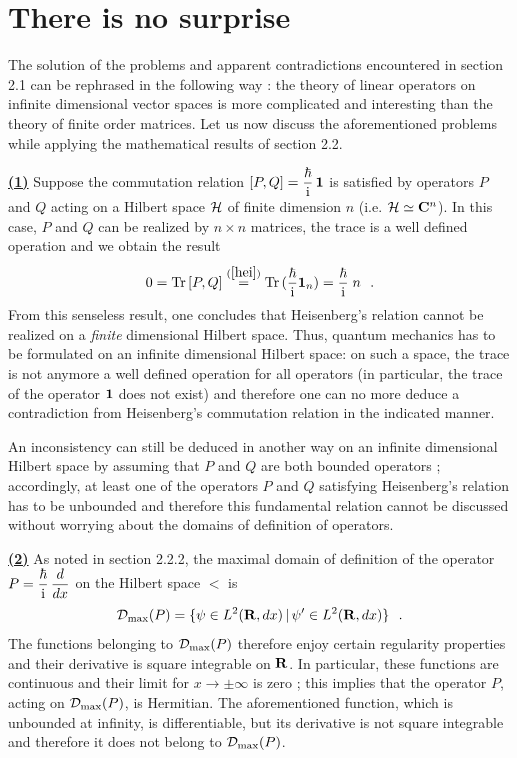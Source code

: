 \documentclass[a4wide,12pt]{report}
\begin{document}
 
\newpage
 
\appendix
 
 
\chapter{There is no surprise}
 
The solution of the problems and apparent contradictions 
encountered in section 2.1
can be rephrased in the following way \cite{rs}:
the theory of linear operators on infinite dimensional vector 
spaces is more complicated and interesting than the theory  
of finite order matrices. Let us now discuss   
the aforementioned problems while applying the mathematical results 
of section 2.2. 

 
\bigskip
 
\underline{{\bf (1)}}
Suppose  the commutation relation 
$[P,Q] = \displaystyle{\hbar \over {\rm i}} \, {\bf 1}$ is satisfied by operators 
$P$ and $Q$ acting on a Hilbert space ${\cal H}$ of finite dimension 
$n$ (i.e. ${\cal H} \simeq {\bf C}^n$). 
In this case, $P$ and $Q$ 
can be realized by $n\times n$ matrices, the trace is a 
well defined operation and we obtain the result 
\[
0 = {\rm Tr} \, [P,Q ] 
\stackrel{(\ref{hei})}{=} {\rm Tr} \, ( \displaystyle{\hbar \over {\rm i}}
{\bf 1}_n ) =
\displaystyle{\hbar \over {\rm i}}\; n
\ \ .
\]
From this senseless result,
one concludes that Heisenberg's relation
cannot be realized on a {\em finite} dimensional Hilbert space. 
Thus, quantum mechanics has to be formulated on an
infinite dimensional Hilbert space: on such a space,  
the trace is not anymore a well defined operation for all operators 
(in particular, the trace of the operator ${\bf 1}$ does not 
exist) and therefore one can no more  deduce a contradiction from 
Heisenberg's commutation relation in the indicated manner. 

An inconsistency can still be deduced in another way 
on an infinite dimensional Hilbert space 
by assuming that 
$P$ and $Q$ are both bounded operators \cite{rs};
accordingly, 
at least one of the operators $P$ and $Q$ satisfying Heisenberg's
relation has to be unbounded and therefore this fundamental relation cannot
be discussed without worrying about the domains of definition of operators. 
 
\bigskip
 
\underline{{\bf (2)}}
As noted in section 2.2.2, 
the maximal domain of definition of the operator 
$P= \displaystyle{\hbar \over {\rm i}} \, \displaystyle{d \over dx}$ 
on the Hilbert space $\lt$
is
\[
{\cal D}_{\rm max} (P) = \{ \psi \in {L^2 ({{\bf R}},dx)} \, | \,
\psi^{\prime} \in {L^2 ({{\bf R}},dx)} \}
\ \ .
\]
The functions belonging to ${\cal D}_{\rm max} (P)$ therefore enjoy  
certain regularity properties and their derivative is square 
integrable on ${\bf R}$. In particular, these functions are continuous and 
their limit for $x \to \pm \infty$ 
is zero \cite{ri, bgc}; this implies that the operator $P$,
acting on ${\cal D}_{\rm max} (P)$, is Hermitian.
The aforementioned 
function, which is unbounded at infinity,  
is differentiable,
but its derivative is not square integrable and therefore 
 it does not belong to 
${\cal D}_{{\rm max}}(P)$.
\end{document}
